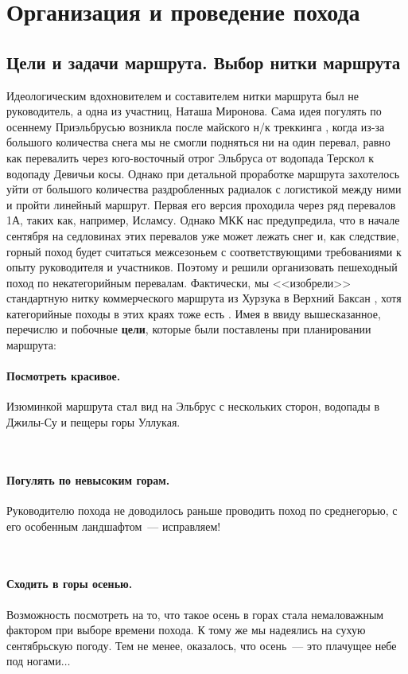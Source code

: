 \section{Организация и проведение похода}
\subsection{Цели и задачи маршрута. Выбор нитки маршрута}
Идеологическим вдохновителем и составителем нитки маршрута был не руководитель, а одна из участниц, Наташа Миронова. Сама идея погулять по осеннему Приэльбрусью возникла после майского н/к треккинга \cite{ostapiv2025}, когда из-за большого количества снега мы не смогли подняться ни на один перевал, равно как перевалить через юго-восточный отрог Эльбруса от водопада Терскол к водопаду Девичьи косы. Однако при детальной проработке маршрута захотелось уйти от большого количества раздробленных радиалок с логистикой между ними и пройти линейный маршрут. Первая его версия проходила через ряд перевалов 1А, таких как, например, Исламсу. Однако МКК нас предупредила, что в начале сентября на седловинах этих перевалов уже может лежать снег и, как следствие, горный поход будет считаться межсезоньем с соответствующими требованиями к опыту руководителя и участников. Поэтому и решили организовать пешеходный поход по некатегорийным перевалам. Фактически, мы <<изобрели>> стандартную нитку коммерческого маршрута из Хурзука в Верхний Баксан \cite{kommersy}, хотя категорийные походы в этих краях тоже есть \cite{elbrus2022sevlova}. Имея в ввиду вышесказанное, перечислю и побочные \textbf{цели}, которые были поставлены при планировании маршрута:

\paragraph{﻿﻿Посмотреть красивое.} Изюминкой маршрута стал вид на Эльбрус с нескольких сторон, водопады в Джилы-Су и пещеры горы Уллукая.

﻿﻿\paragraph{﻿﻿Погулять по невысоким горам.} Руководителю похода не доводилось раньше проводить поход по среднегорью, с его особенным ландшафтом~--- исправляем!
	
	
﻿﻿\paragraph{﻿﻿Сходить в горы осенью.} Возможность посмотреть на то, что такое осень в горах стала немаловажным фактором при выборе времени похода. К тому же мы надеялись на сухую сентябрьскую погоду. Тем не менее, оказалось, что осень~--- это плачущее небе под ногами$\ldots$

